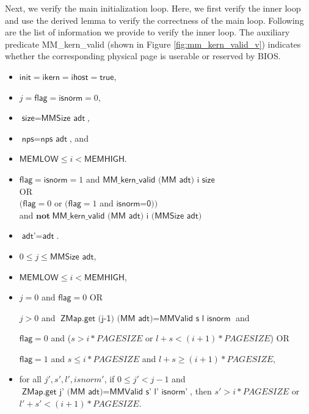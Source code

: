 Next, we verify the main initialization loop. Here, we first verify the inner loop and use the derived lemma to verify the
correctness of the main loop. Following are the list of information we provide to verify the inner loop.
The auxiliary predicate \textsf{MM\_kern\_valid} (shown in Figure \ref{fig:mm_kern_valid_v}) indicates whether
the corresponding physical page is userable or reserved by BIOS.

\begin{definition} 
\begin{itemize}
\item $\textsf{init} = \textsf{ikern} = \textsf{ihost} = \textsf{true}$,
\item $j=\textsf{flag}=\textsf{isnorm}=0$,
\item $\textsf{size}=\textsf{MMSize adt}$,
\item $\textsf{nps}=\textsf{nps adt}$, and
\item $\textsf{MEMLOW}\le i < \textsf{MEMHIGH}$.
\end{itemize}
\end{definition}

\begin{definition} 
\begin{itemize}
\item $\textsf{flag}=\textsf{isnorm}=1$ and $\textsf{MM\_kern\_valid (MM adt) i size}$\\OR\\
$(\textsf{flag}=0$ or $(\textsf{flag}=1$ and $\textsf{isnorm=0}))$\\ and $\textbf{not}~\textsf{MM\_kern\_valid (MM adt) i (MMSize adt)}$
\item $\textsf{adt'}=\textsf{adt}$.
\end{itemize}
\end{definition}

\begin{definition}
\begin{itemize}
\item $0\le j \le \textsf{MMSize adt}$,
\item $\textsf{MEMLOW}\le i < \textsf{MEMHIGH}$,
\item $j=0$ and $\textsf{flag}=0$      OR

$j>0$ and $\textsf{ZMap.get (j-1) (MM adt)} = \textsf{MMValid s l isnorm}$ and

\hspace{10mm}$\textsf{flag}=0$ and ($s > i * PAGESIZE$ or $l + s < (i + 1) * PAGESIZE$)      OR
	
\hspace{10mm}$\textsf{flag}=1$ and $s \le i * PAGESIZE$ and $l + s \geq (i + 1) * PAGESIZE$,

\item for all $j', s', l', isnorm'$, if $0\le j' < j - 1$ and $\textsf{ZMap.get j' (MM adt)} = \textsf{MMValid s' l' isnorm'}$, then
$s' > i * PAGESIZE$ or $l' + s' < (i + 1) * PAGESIZE$.
\end{itemize}
\end{definition}

